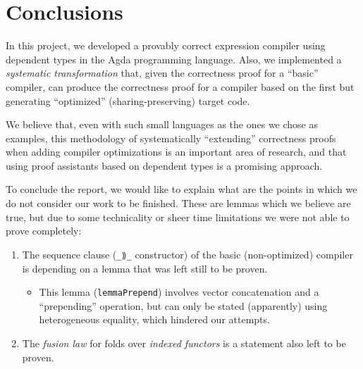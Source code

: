 \documentclass[a4paper]{article}
\begin{document}
    \section{Conclusions}
    \label{sec:conclusions}
        In this project, we developed a provably correct expression compiler using dependent types in the Agda programming language.
        Also, we implemented a \emph{systematic transformation} that, given the correctness proof for
        a ``basic'' compiler, can produce the correctness proof for a compiler based on the first but
        generating ``optimized'' (sharing-preserving) target code.

        We believe that, even with such small languages as the ones we chose as examples,
        this methodology of systematically ``extending'' correctness proofs when adding compiler optimizations
        is an important area of research, and that using proof assistants based on dependent types is a
        promising approach.

        To conclude the report, we would like to explain what are the points in which we do not consider our work
        to be finished. These are lemmas which we believe are true, but due to some technicality or sheer
        time limitations we were not able to prove completely:

        \begin{enumerate}
            \item The sequence clause (\texttt{\_⟫\_} constructor) of the basic (non-optimized) compiler
                is depending on a lemma that was left still to be proven.
                \begin{itemize}
                    \item This lemma (\texttt{lemmaPrepend}) involves vector concatenation and a ``prepending'' operation,
                        but can only be stated (apparently) using heterogeneous equality, which hindered our attempts.
                \end{itemize}

            \item The \emph{fusion law} for folds over \emph{indexed functors} is a statement also left
                to be proven.
        \end{enumerate}
\end{document}
